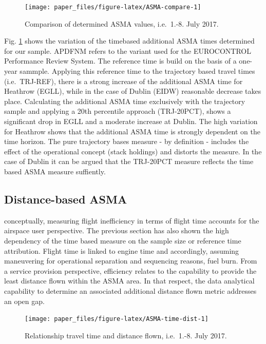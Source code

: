 \documentclass[conference,final,a4paper,]{IEEEtran}
\begin{document}
\begin{figure}[hbt]

{\centering \texttt{[image: paper\_files/figure-latex/ASMA-compare-1]} 

}

\caption{Comparison of determined ASMA values, i.e.~1.-8. July
2017.}\label{fig:ASMA-compare}
\end{figure}

Fig. \ref{fig:ASMA-compare} shows the variation of the timebased
additional ASMA times determined for our sample. APDFNM refers to the
variant used for the EUROCONTROL Performance Review System. The
reference time is build on the basis of a one-year sammple. Applying
this reference time to the trajectory based travel times (i.e.~TRJ-REF),
there is a strong increase of the additional ASMA time for Heathrow
(EGLL), while in the case of Dublin (EIDW) reasonable decrease takes
place. Calculating the additional ASMA time exclusively with the
trajectory sample and applying a 20th percentile approach (TRJ-20PCT),
shows a significant drop in EGLL and a moderate increase at Dublin. The
high variation for Heathrow shows that the additional ASMA time is
strongly dependent on the time horizon. The pure trajectory bases
measure - by definition - includes the effect of the operational concept
(stack holdings) and distorts the measure. In the case of Dublin it can
be argued that the TRJ-20PCT measure reflects the time based ASMA
measure suffiently.

\subsection{Distance-based ASMA}\label{distance-based-asma}

conceptually, measuring flight inefficiency in terms of flight time
accounts for the airspace user perspective. The previous section has
also shown the high dependency of the time based measure on the sample
size or reference time attribution. Flight time is linked to engine time
and accordingly, assuming maneuvering for operational separation and
sequencing reasons, fuel burn. From a service provision perspective,
efficiency relates to the capability to provide the least distance flown
within the ASMA area. In that respect, the data analytical capability to
determine an associated additional distance flown metric addresses an
open gap.




\begin{figure}[H]

{\centering \texttt{[image: paper\_files/figure-latex/ASMA-time-dist-1]} 

}

\caption{Relationship travel time and distance flown,
i.e.~1.-8. July 2017.}\label{fig:ASMA-time-dist}
\end{figure}
\end{document}
